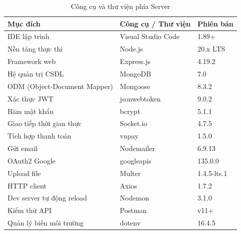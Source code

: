 \documentclass[../DoAn.tex]{subfiles}
\begin{document}
\begin{table}[H]
\centering
\caption{Công cụ và thư viện phía Server}
\label{tab:tools-server}
\scriptsize
\begin{tabular}{|p{4.5cm}|p{3.5cm}|p{5cm}|}
\hline
\textbf{Mục đích} & \textbf{Công cụ / Thư viện} & \textbf{Phiên bản} \\
\hline
IDE lập trình & Visual Studio Code & 1.89+ \\
\hline
Nền tảng thực thi & Node.js & 20.x LTS \\
\hline
Framework web & Express.js & 4.19.2 \\
\hline
Hệ quản trị CSDL & MongoDB & 7.0 \\
\hline
ODM (Object-Document Mapper) & Mongoose & 8.3.2 \\
\hline
Xác thực JWT & jsonwebtoken & 9.0.2 \\
\hline
Băm mật khẩu & bcrypt & 5.1.1 \\
\hline
Giao tiếp thời gian thực & Socket.io & 4.7.5 \\
\hline
Tích hợp thanh toán & vnpay & 1.5.0 \\
\hline
Gửi email & Nodemailer & 6.9.13 \\
\hline
OAuth2 Google & googleapis & 135.0.0 \\
\hline
Upload file & Multer & 1.4.5-lts.1 \\
\hline
HTTP client & Axios & 1.7.2 \\
\hline
Dev server tự động reload & Nodemon & 3.1.0 \\
\hline
Kiểm thử API & Postman & v11+ \\
\hline
Quản lý biến môi trường & dotenv & 16.4.5 \\
\hline
\end{tabular}
\end{table}
\end{document}
